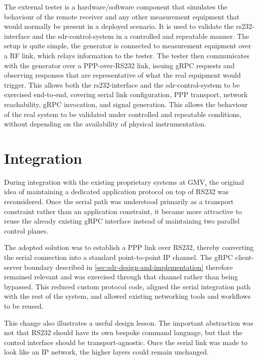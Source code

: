 The external tester is a hardware/software component that simulates the
behaviour of the remote receiver and any other measurement equipment that would
normally be present in a deployed scenario. It is used to validate the
\gls{rs232-interface} and the \gls{sdr-control-system} in a controlled and
repeatable manner. The setup is quite simple, the generator is connected to
measurement equipment over a \gls{RF} link, which relays information to the
tester. The tester then communicates with the generator over a
\gls{PPP}-over-\gls{RS232} link, issuing gRPC requests and observing responses
that are representative of what the real equipment would trigger. This allows
both the \gls{rs232-interface} and the \gls{sdr-control-system} to be
exercised end-to-end, covering serial link configuration, \gls{PPP} transport,
network reachability, gRPC invocation, and signal generation. This allows the
behaviour of the real system to be validated under controlled and repeatable
conditions, without depending on the availability of physical instrumentation.


\section{Integration}
\label{sec:integration}

During integration with the existing proprietary systems at GMV, the original
idea of maintaining a dedicated application protocol on top of \gls{RS232} was
reconsidered. Once the serial path was understood primarily as a transport
constraint rather than an application constraint, it became more attractive to
reuse the already existing gRPC interface instead of maintaining two parallel
control planes.

The adopted solution was to establish a \gls{PPP} link over \gls{RS232},
thereby converting the serial connection into a standard point-to-point IP
channel. The gRPC client-server boundary described in
\autoref{sec:sdr-design-and-implementation} therefore remained relevant and was
exercised through that channel rather than being bypassed. This reduced custom
protocol code, aligned the serial integration path with the rest of the system,
and allowed existing networking tools and workflows to be reused.

This change also illustrates a useful design lesson. The important abstraction
was not that \gls{RS232} should have its own bespoke command language, but that
the control interface should be transport-agnostic. Once the serial link was
made to look like an IP network, the higher layers could remain unchanged.

